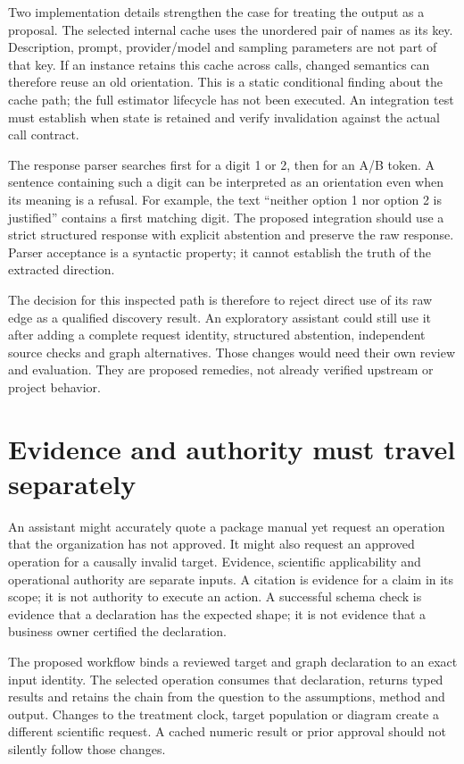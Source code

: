 Two implementation details strengthen the case for treating the output as a
proposal. The selected internal cache uses the unordered pair of names as its
key. Description, prompt, provider/model and sampling parameters are not part
of that key. If an instance retains this cache across calls, changed semantics
can therefore reuse an old orientation. This is a static conditional finding
about the cache path; the full estimator lifecycle has not been executed.
An integration test must establish when state is retained and verify
invalidation against the actual call contract. \citep{v12_sw_pgmpy}

The response parser searches first for a digit 1 or 2, then for an A/B token.
A sentence containing such a digit can be interpreted as an orientation even
when its meaning is a refusal. For example, the text ``neither option 1 nor
option 2 is justified'' contains a first matching digit. The proposed
integration should use a strict structured response with explicit abstention
and preserve the raw response. Parser acceptance is a syntactic property;
it cannot establish the truth of the extracted direction.

The decision for this inspected path is therefore to reject direct use of its
raw edge as a qualified discovery result. An exploratory assistant could still
use it after adding a complete request identity, structured abstention,
independent source checks and graph alternatives. Those changes would need
their own review and evaluation. They are proposed remedies, not already
verified upstream or project behavior.

\section{Evidence and authority must travel separately}

An assistant might accurately quote a package manual yet request an operation
that the organization has not approved. It might also request an approved
operation for a causally invalid target. Evidence, scientific applicability
and operational authority are separate inputs. A citation is evidence for a
claim in its scope; it is not authority to execute an action. A successful
schema check is evidence that a declaration has the expected shape; it is not
evidence that a business owner certified the declaration.

The proposed workflow binds a reviewed target and graph declaration to an
exact input identity. The selected operation consumes that declaration,
returns typed results and retains the chain from the question to the
assumptions, method and output. Changes to the treatment clock, target
population or diagram create a different scientific request. A cached
numeric result or prior approval should not silently follow those changes.

